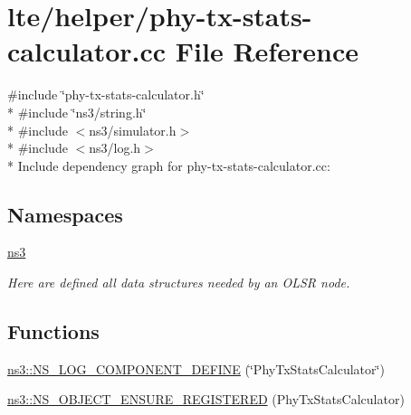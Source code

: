 \hypertarget{phy-tx-stats-calculator_8cc}{}\section{lte/helper/phy-\/tx-\/stats-\/calculator.cc File Reference}
\label{phy-tx-stats-calculator_8cc}
{\ttfamily \#include \char`\"{}phy-\/tx-\/stats-\/calculator.\+h\char`\"{}}\\*
{\ttfamily \#include \char`\"{}ns3/string.\+h\char`\"{}}\\*
{\ttfamily \#include $<$ns3/simulator.\+h$>$}\\*
{\ttfamily \#include $<$ns3/log.\+h$>$}\\*
Include dependency graph for phy-\/tx-\/stats-\/calculator.cc\+:
\subsection*{Namespaces}
\begin{DoxyCompactItemize}
\item 
 \hyperlink{namespacens3}{ns3}
\begin{DoxyCompactList}\small\item\em Here are defined all data structures needed by an O\+L\+SR node. \end{DoxyCompactList}\end{DoxyCompactItemize}
\subsection*{Functions}
\begin{DoxyCompactItemize}
\item 
\hyperlink{namespacens3_ad94ae13b0b921e36e154b9539e00e1be}{ns3\+::\+N\+S\+\_\+\+L\+O\+G\+\_\+\+C\+O\+M\+P\+O\+N\+E\+N\+T\+\_\+\+D\+E\+F\+I\+NE} (\char`\"{}Phy\+Tx\+Stats\+Calculator\char`\"{})
\item 
\hyperlink{namespacens3_a6666f7c9e82ad9d949ab7ece0fe3518e}{ns3\+::\+N\+S\+\_\+\+O\+B\+J\+E\+C\+T\+\_\+\+E\+N\+S\+U\+R\+E\+\_\+\+R\+E\+G\+I\+S\+T\+E\+R\+ED} (Phy\+Tx\+Stats\+Calculator)
\end{DoxyCompactItemize}

